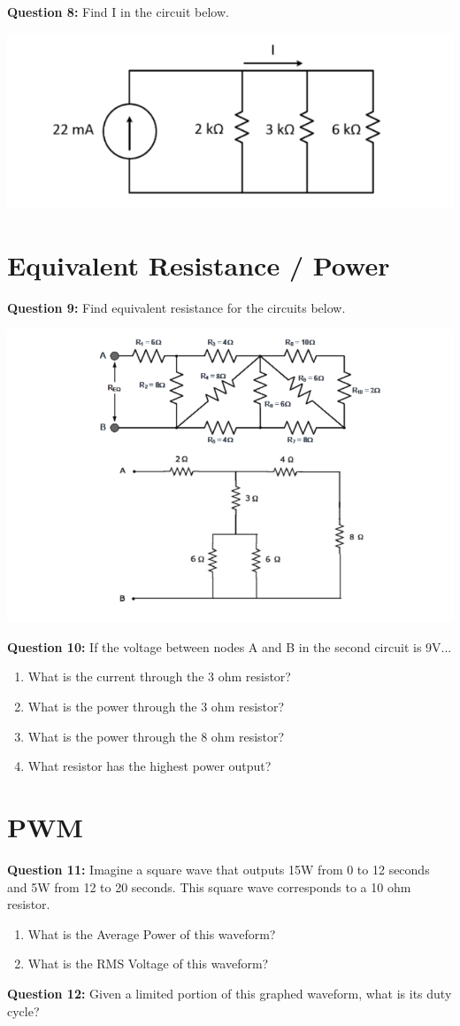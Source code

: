 \documentclass{article}
\begin{document}
\textbf{Question 8:} Find I in the circuit below.

\begin{center}
\includegraphics[width=0.75\linewidth]{figures/6.png}
\end{center}

\section*{Equivalent Resistance / Power}
\textbf{Question 9:} Find equivalent resistance for the circuits below.

\begin{center}

        \includegraphics[width=0.75\linewidth]{figures/image.png}
\end{center}

\textbf{Question 10:} If the voltage between nodes A and B in the second circuit is 9V...
\begin{enumerate}
\item What is the current through the 3 ohm resistor?
\item What is the power through the 3 ohm resistor?
\item What is the power through the 8 ohm resistor?
\item What resistor has the highest power output?
\end{enumerate}

\section*{PWM}
\textbf{Question 11:} Imagine a square wave that outputs 15W from 0 to 12 seconds and 5W from 12 to 20 seconds. This square wave corresponds to a 10 ohm resistor.
\begin{enumerate}
    \item What is the Average Power of this waveform?
    \item What is the RMS Voltage of this waveform?
\end{enumerate}
\textbf{Question 12:} Given a limited portion of this graphed waveform, what is its duty cycle?
\end{document}
